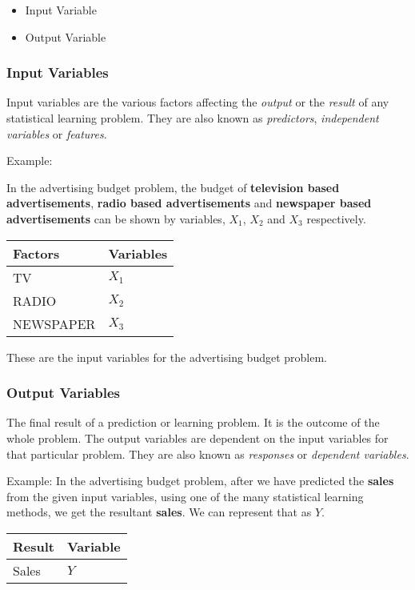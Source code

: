 \documentclass[11pt]{article}
\providecommand{\tightlist}{%
      \setlength{\itemsep}{0pt}\setlength{\parskip}{0pt}}
\begin{document}
\begin{itemize}
\tightlist
\item
  Input Variable
\item
  Output Variable
\end{itemize}

    \hypertarget{input-variables}{%
\subsubsection{Input Variables}\label{input-variables}}

Input variables are the various factors affecting the \emph{output} or
the \emph{result} of any statistical learning problem. They are also
known as \emph{predictors}, \emph{independent variables} or
\emph{features}.

Example:

In the advertising budget problem, the budget of \textbf{television
based advertisements}, \textbf{radio based advertisements} and
\textbf{newspaper based advertisements} can be shown by variables,
\textbf{\(X_{1}\)}, \textbf{\(X_{2}\)} and \textbf{\(X_{3}\)}
respectively.

\begin{longtable}[]{@{}ll@{}}
\toprule
Factors & Variables\tabularnewline
\midrule
\endhead
TV & \(X_{1}\)\tabularnewline
RADIO & \(X_{2}\)\tabularnewline
NEWSPAPER & \(X_{3}\)\tabularnewline
\bottomrule
\end{longtable}

These are the input variables for the advertising budget problem.

    \hypertarget{output-variables}{%
\subsubsection{Output Variables}\label{output-variables}}

The final result of a prediction or learning problem. It is the outcome
of the whole problem. The output variables are dependent on the input
variables for that particular problem. They are also known as
\emph{responses} or \emph{dependent variables}.

Example: In the advertising budget problem, after we have predicted the
\textbf{sales} from the given input variables, using one of the many
statistical learning methods, we get the resultant \textbf{sales}. We
can represent that as \textbf{\(Y\)}.

\begin{longtable}[]{@{}ll@{}}
\toprule
Result & Variable\tabularnewline
\midrule
\endhead
Sales & \(Y\)\tabularnewline
\bottomrule
\end{longtable}
\end{document}
